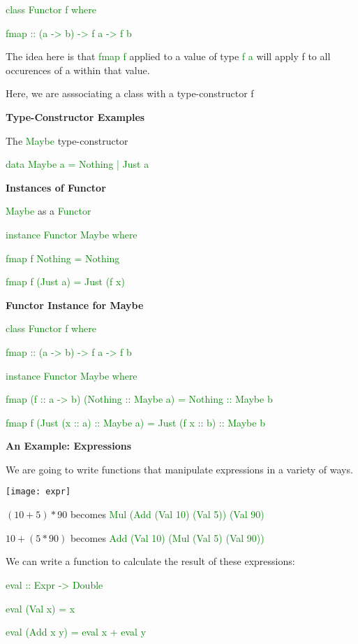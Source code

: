 \documentclass{article}
\begin{document}
\textcolor{green}{class Functor  f where}

\textcolor{green}{fmap  ::  (a -> b) -> f  a -> f  b}

The idea here is that \textcolor{green}{fmap  f} applied to a value of type \textcolor{green}{f  a} will apply f to all occurences of a within that value.

Here, we are asssociating a class with a type-constructor  f


\textbf{Type-Constructor Examples}

The \textcolor{green}{Maybe} type-constructor

\textcolor{green}{data Maybe a = Nothing | Just a}

\textbf{Instances of Functor}

\textcolor{green}{Maybe} as a \textcolor{green}{Functor}

\textcolor{green}{instance Functor Maybe where}

\textcolor{green}{fmap f Nothing = Nothing}

\textcolor{green}{fmap f (Just a) = Just (f x)}


\textbf{Functor Instance for Maybe}

\textcolor{green}{class Functor f where}

\textcolor{green}{fmap :: (a -> b) -> f a -> f b}


\textcolor{green}{instance Functor Maybe where}

\textcolor{green}{fmap (f :: a -> b) (Nothing :: Maybe a) = Nothing :: Maybe b}

\textcolor{green}{fmap f (Just (x :: a) :: Maybe a) = Just (f x :: b) :: Maybe b}


\textbf{An Example: Expressions}

We are going to write functions that manipulate expressions in a variety of ways.

\texttt{[image: expr]}

$(10 + 5) * 90$ becomes \textcolor{green}{Mul  (Add  (Val 10)  (Val 5))  (Val 90)}

$10 + (5 * 90)$ becomes \textcolor{green}{Add  (Val 10)  (Mul  (Val 5)  (Val 90))}

We can write a function to calculate the result of these expressions:

\textcolor{green}{eval  ::  Expr -> Double}

\textcolor{green}{eval  (Val x) = x}

\textcolor{green}{eval  (Add  x  y) = eval x + eval y}
\end{document}
